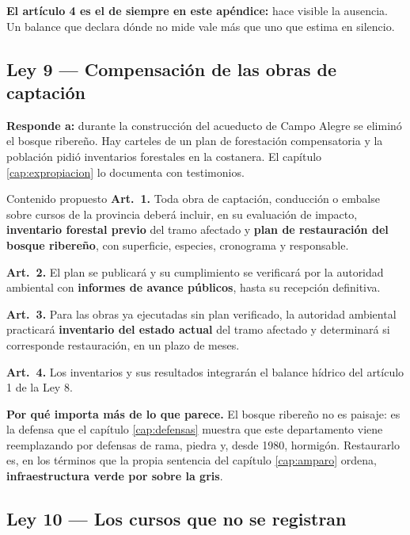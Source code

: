 \textbf{El artículo 4 es el de siempre en este apéndice:} hace visible la ausencia. Un balance
que declara dónde no mide vale más que uno que estima en silencio.

\subsection{Ley 9 --- Compensación de las obras de captación}

\textbf{Responde a:} durante la construcción del acueducto de Campo Alegre se eliminó el
bosque ribereño. Hay carteles de un plan de forestación compensatoria y la población pidió
inventarios forestales en la costanera. El capítulo \ref{cap:expropiacion} lo documenta con
testimonios.

\begin{ficha}{Contenido propuesto}
\textbf{Art.\ 1.} Toda obra de captación, conducción o embalse sobre cursos de la provincia
deberá incluir, en su evaluación de impacto, \textbf{inventario forestal previo} del tramo
afectado y \textbf{plan de restauración del bosque ribereño}, con superficie, especies,
cronograma y responsable.

\textbf{Art.\ 2.} El plan se publicará y su cumplimiento se verificará por la autoridad
ambiental con \textbf{informes de avance públicos}, hasta su recepción definitiva.

\textbf{Art.\ 3.} Para las obras ya ejecutadas sin plan verificado, la autoridad ambiental
practicará \textbf{inventario del estado actual} del tramo afectado y determinará si
corresponde restauración, en un plazo de \underline{\hspace{1.2cm}} meses.

\textbf{Art.\ 4.} Los inventarios y sus resultados integrarán el balance hídrico del artículo
1 de la Ley 8.
\end{ficha}

\textbf{Por qué importa más de lo que parece.} El bosque ribereño no es paisaje: es la defensa
que el capítulo \ref{cap:defensas} muestra que este departamento viene reemplazando por defensas de rama, piedra y, desde 1980, hormigón. Restaurarlo es, en los términos que la propia sentencia del capítulo
\ref{cap:amparo} ordena, \textbf{infraestructura verde por sobre la gris}.

\subsection{Ley 10 --- Los cursos que no se registran}


